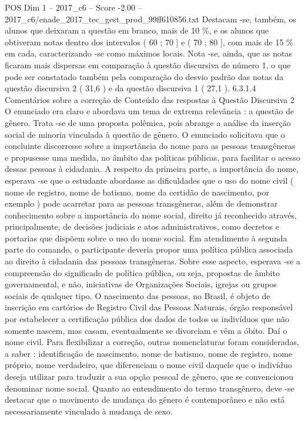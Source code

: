 \begin{textsample}{POS Dim 1 – 2017\_c6 – Score -2.00 – 2017\_c6/enade\_2017\_tec\_gest\_prod\_99ff610856.txt}
Destacam -se, também, os alunos que deixaram a questão em branco, mais de 10 \%, e os alunos que obtiveram notas dentro dos intervalos ( 60 ; 70 ] e ( 70 ; 80 ], com mais de 15 \% em cada, caracterizando -se como máximos locais.
Nota -se, ainda, que as notas ficaram mais dispersas em comparação à questão discursiva de número 1, o que pode ser constatado também pela comparação do desvio padrão das notas da questão discursiva 2 ( 31,6 ) e da questão discursiva 1 ( 27,1 ). 6.3.1.4 Comentários sobre a correção de Conteúdo das respostas à Questão Discursiva 2 O enunciado era claro e abordava um tema de extrema relevância : a questão de gênero.
Trata -se de uma proposta polêmica, pois abrange a análise da inserção social de minoria vinculada à questão de gênero.
O enunciado solicitava que o concluinte discorresse sobre a importância do nome para as pessoas transgêneras e propusesse uma medida, no âmbito das políticas públicas, para facilitar o acesso dessas pessoas à cidadania.
A respeito da primeira parte, a importância do nome, esperava -se que o estudante abordasse as dificuldades que o uso do nome civil ( nome de registro, nome de batismo, nome da certidão de nascimento, por exemplo ) pode acarretar para as pessoas transgêneras, além de demonstrar conhecimento sobre a importância do nome social, direito já reconhecido através, principalmente, de decisões judiciais e atos administrativos, como decretos e portarias que dispõem sobre o uso do nome social.
Em atendimento à segunda parte do comando, o participante deveria propor uma política pública associada ao direito à cidadania das pessoas transgêneras.
Sobre esse aspecto, esperava -se a compreensão do significado de política pública, ou seja, propostas de âmbito governamental, e não, iniciativas de Organizações Sociais, igrejas ou grupos sociais de qualquer tipo.
O nascimento das pessoas, no Brasil, é objeto de inscrição em cartórios de Registro Civil das Pessoas Naturais, órgão responsável por estabelecer a certificação pública dos dados de todos os indivíduos que não somente nascem, mas casam, eventualmente se divorciam e vêm a óbito.
Daí o nome civil.
Para flexibilizar a correção, outras nomenclaturas foram consideradas, a saber : identificação de nascimento, nome de batismo, nome de registro, nome próprio, nome verdadeiro, que diferenciam o nome civil daquele que o indivíduo deseja utilizar para traduzir a sua opção pessoal de gênero, que se convencionou denominar nome social.
Quanto ao entendimento do termo transgênero, deve -se destacar que o movimento de mudança do gênero é contemporâneo e não está necessariamente vinculado à mudança de sexo.

\end{textsample}
